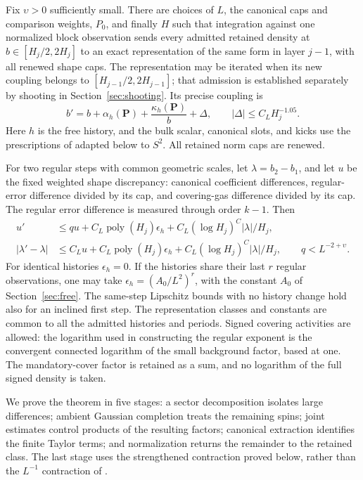\begin{theorem}
\label{thm:rg-step}
Fix $\upsilon>0$ sufficiently small.  There are choices of $L$, the
canonical caps and comparison weights, $P_0$, and finally $H$ such that
integration against one normalized block observation sends every
admitted retained density at $b\in[H_j/2,2H_j]$ to an exact
representation of the same form in layer $j-1$, with all renewed
shape caps.  The representation may be iterated when its new coupling
belongs to $[H_{j-1}/2,2H_{j-1}]$; that admission is established
separately by shooting in Section~\ref{sec:shooting}.  Its precise
coupling is
\begin{equation}
 b'=b+\alpha_h(\mathbf P)+\frac{\kappa_h(\mathbf P)}b+\Delta,
 \qquad |\Delta|\le C_LH_j^{-1.05}.
 \label{eq:orig-4}
\end{equation}
Here $h$ is the free history, and the bulk scalar, canonical slots,
and kicks use the prescriptions of  adapted
below to $S^2$.  All retained norm caps are renewed.

For two regular steps with common geometric scales, let
$\lambda=b_2-b_1$, and let $u$ be the fixed weighted shape discrepancy:
canonical coefficient differences, regular-error difference divided by
its cap, and covering-gas difference divided by its cap.  The regular
error difference is measured through order $k-1$.  Then
\begin{align}
 u'&\le q u+C_L\operatorname{poly}(H_j)\epsilon_h
       +C_L(\log H_j)^C|\lambda|/H_j,\nonumber\\
 |\lambda'-\lambda|&\le C_Lu+C_L\operatorname{poly}(H_j)\epsilon_h
       +C_L(\log H_j)^C|\lambda|/H_j,
 \qquad q<L^{-2+\upsilon}.
 \label{eq:orig-5}
\end{align}
For identical histories $\epsilon_h=0$.  If the histories share their
last $r$ regular observations, one may take
$\epsilon_h=(A_0/L^2)^r$, with the constant $A_0$ of
Section~\ref{sec:free}.  The same-step Lipschitz bounds with no history
change hold also for an inclined first step.  The representation classes and constants
are common to all the admitted histories and periods.  Signed covering
activities are allowed: the logarithm used in constructing the regular
exponent is the convergent connected logarithm of the small background
factor, based at one.  The mandatory-cover factor is retained as a sum,
and no logarithm of the full signed density is taken.
\end{theorem}

We prove the theorem in five stages: a sector decomposition isolates
large differences; ambient Gaussian completion treats the remaining
spins; joint estimates control products of the resulting factors;
canonical extraction identifies the finite Taylor terms; and
normalization returns the remainder to the retained class.  The last
stage uses the strengthened contraction proved below, rather than the
$L^{-1}$ contraction of .

